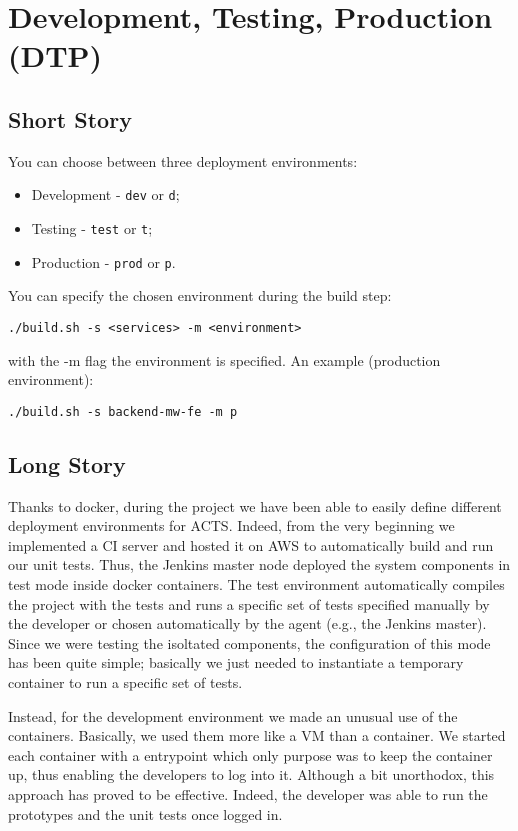 
\section{Development, Testing, Production (DTP)}

\subsection{Short Story}
You can choose between three deployment environments:
\begin{itemize}
\item Development - \texttt{dev} or \texttt{d};
\item Testing - \texttt{test} or \texttt{t};
\item Production - \texttt{prod} or \texttt{p}.
\end{itemize}

You can specify the chosen environment during the build step:

\begin{lstlisting}
./build.sh -s <services> -m <environment>
\end{lstlisting}

with the -m flag the environment is specified.
An example (production environment):

\begin{lstlisting}
./build.sh -s backend-mw-fe -m p
\end{lstlisting}

\subsection{Long Story}
Thanks to docker, during the project we have been able to easily define different
deployment environments for ACTS. Indeed, from the very beginning we implemented a CI server and hosted it
on AWS to automatically build and run our unit tests. Thus, the Jenkins master node deployed the
system components in test mode inside docker containers.
The test environment automatically compiles the project with the tests and
runs a specific set of tests specified manually by the developer or chosen automatically by
the agent (e.g., the Jenkins master). Since
we were testing the isoltated components, the configuration of this mode has been quite simple;
basically we just needed to instantiate a temporary
container to run a specific set of tests.

Instead, for the development environment we made an unusual use of the containers. Basically, we
used them more like a VM than a container. We started each container with a entrypoint which
only purpose was to keep the container up, thus enabling the developers to log into it.
Although a bit unorthodox, this approach has proved to be effective. Indeed, the developer
was able to run the prototypes and the unit tests once logged in.


